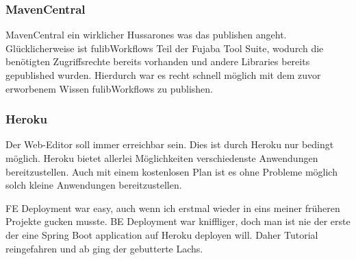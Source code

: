\subsubsection{MavenCentral}\label{subsubsec:mavencentral}
\todo
MavenCentral ein wirklicher Hussarones was das publishen angeht.
Glücklicherweise ist fulibWorkflows Teil der Fujaba Tool Suite, wodurch die benötigten
Zugriffsrechte bereits vorhanden und andere Libraries bereits gepublished wurden.
Hierdurch war es recht schnell möglich mit dem zuvor erworbenem Wissen fulibWorkflows
zu publishen.

\subsubsection{Heroku}\label{subsubsec:heroku}
\todo
Der Web-Editor soll immer erreichbar sein.
Dies ist durch Heroku nur bedingt möglich.
Heroku bietet allerlei Möglichkeiten verschiedenste Anwendungen bereitzustellen.
Auch mit einem kostenlosen Plan ist es ohne Probleme möglich solch kleine Anwendungen bereitzustellen.

FE Deployment war easy, auch wenn ich erstmal wieder in eins meiner früheren Projekte gucken musste.
BE Deployment war kniffliger, doch man ist nie der erste der eine Spring Boot application
auf Heroku deployen will.
Daher Tutorial reingefahren und ab ging der gebutterte Lachs.
